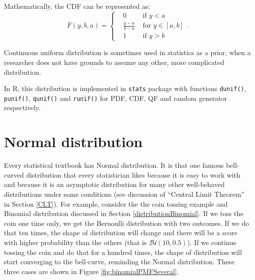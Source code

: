 \documentclass[
]{book}
\theoremstyle{definition}
\theoremstyle{definition}
\theoremstyle{definition}
\theoremstyle{definition}
\theoremstyle{remark}
\begin{document}
Mathematically, the CDF can be represented as:
\begin{equation}
    F(y, b, a) = \left\{\begin{aligned}
                        & 0 & \text{ if } y<a \\
                        & \frac{y-a}{b-a} & \text{ for } y \in [a, b] \\
                        & 1 & \text{ if } y>b
                    \end{aligned} \right. .
    \label{eq:ContinuousUniformCDF}
\end{equation}

Continuous uniform distribution is sometimes used in statistics as a prior, when a researcher does not have grounds to assume any other, more complicated distribution.

In R, this distribution is implemented in \texttt{stats} package with functions \texttt{dunif()}, \texttt{punif()}, \texttt{qunif()} and \texttt{runif()} for PDF, CDF, QF and random generator respectively.

\hypertarget{distributionsNormal}{%
\section{Normal distribution}\label{distributionsNormal}}

Every statistical textbook has Normal distribution. It is that one famous bell-curved distribution that every statistician likes because it is easy to work with and because it is an asymptotic distribution for many other well-behaved distributions under some conditions (see discussion of ``Central Limit Theorem'' in Section \ref{CLT}). For example, consider the the coin tossing example and Binomial distribution discussed in Section \ref{distributionBinomial}. If we toss the coin one time only, we get the Bernoulli distribution with two outcomes. If we do that ten times, the shape of distribution will change and there will be a score with higher probability than the others (that is \(\mathcal{Bi}(10, 0.5)\)). If we continue tossing the coin and do that for a hundred times, the shape of distribution will start converging to the bell-curve, reminding the Normal distribution. These three cases are shown in Figure \ref{fig:binomialPMFSeveral}.
\end{document}
